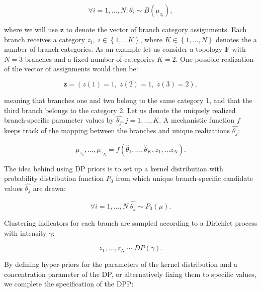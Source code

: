 \begin{equation}
\forall i=1,\ldots,N: \theta_{i}\sim B(\mu_{z_{i}}),
\label{eq:dpp1}
\end{equation}

\noindent
where we will use $\mathbf{z}$ to denote the vector of branch category assignments.
Each branch receives a category $z_{i},\; i\in\left\{ 1,\ldots K\right\}$, where $K\in\left\{ 1,\ldots,N\right\}$ denotes the a number of branch categories.
As an example let us consider a topology $\mathbf{F}$ with $N=3$ branches and a fixed number of categories $K=2$.
One possible realization of the vector of assignments would then be:

$$\mathbf{z}=\left(z(1)=1,\; z(2)=1,\; z(3)=2\right),$$ 

\noindent
meaning that branches one and two belong to the same category 1, and that the third branch belongs to the category 2.
Let us denote the uniquely realized branch-specific parameter values by $\hat{\theta_{j}}, j=1,\ldots,K$.
A mechanistic function $f$ keeps track of the mapping between the branches and unique realizations $\hat{\theta_{j}}$:

\begin{equation}
\mu_{z_{1}},\ldots,\mu_{z_{N}}=f\left(\hat{\theta}_{1},\ldots,\hat{\theta}_{K},z_{1},\ldots z_{N}\right).
\label{eq:dpp2}
\end{equation}

\noindent
The idea behind using DP priors is to set up a kernel distribution with probability distribution function $P_{0}$ from which unique branch-specific candidate values $\hat{\theta_{j}}$ are drawn:

\begin{equation}
\forall i=1,\ldots,N\;\hat{\theta_{j}}\sim P_{0}\left(\mu\right).
\label{eq:dpp3}
\end{equation}

\noindent
Clustering indicators for each branch are sampled according to a Dirichlet process with intensity $\gamma$:

\begin{equation}
z_{1},\ldots,z_{N}\sim DP(\gamma).
\label{eq:dpp4}
\end{equation}

\noindent
By defining hyper-priors for the parameters of the kernel distribution and a concentration parameter of the DP, or alternatively fixing them to specific values, we complete the specification of the DPP:

